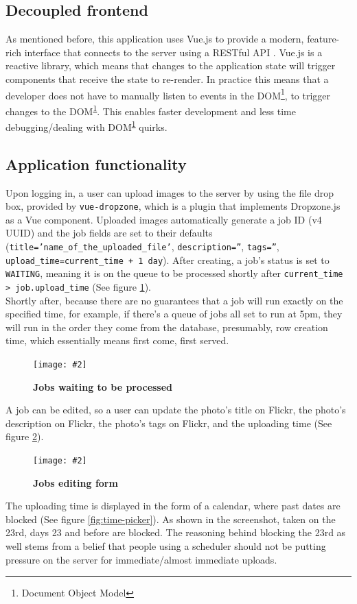 \documentclass[10pt, a4paper]{article}
\newcommand{\figuremacro}[5]{
\begin{figure}[#1]
\centering
\texttt{[image: \#2]}
\caption[#3]{\textbf{#3}#4}
\label{fig:#2}
\end{figure}
}
\newcommand{\footref}[1]{\textsuperscript{\ref{#1}}}
\begin{document}
        \subsection{Decoupled frontend}
        As mentioned before, this application uses Vue.js to provide a modern, feature-rich interface that connects to the server using a RESTful API \cite{restful_api}. Vue.js is a reactive library, which means that changes to the application state will trigger components that receive the state to re-render. In practice this means that a developer does not have to manually listen to events in the DOM\footnote{\label{ft:DOM}Document Object Model}, to trigger changes to the DOM\footref{ft:DOM}. This enables faster development and less time debugging/dealing with DOM\footref{ft:DOM} quirks.

        \subsection{Application functionality}
        Upon logging in, a user can upload images to the server by using the file drop box, provided by \texttt{vue-dropzone}\cite{vue-dropzone}, which is a plugin that implements Dropzone.js as a Vue component. Uploaded images automatically generate a job ID (v4 UUID\cite{itu_uuid}) and the job fields are set to their defaults (\texttt{title='name\_of\_the\_uploaded\_file'}, \texttt{description=''}, \texttt{tags=''}, \texttt{upload\_time=current\_time + 1 day}). After creating, a job's status is set to \texttt{WAITING}, meaning it is on the queue to be processed shortly after \texttt{current\_time > job.upload\_time} (See figure \ref{fig:waiting-jobs}).\\
        Shortly after, because there are no guarantees that a job will run exactly on the specified time, for example, if there's a queue of jobs all set to run at 5pm, they will run in the order they come from the database, presumably, row creation time, which essentially means first come, first served.

        \figuremacro{h}{waiting-jobs}{Jobs waiting to be processed}{}{1.0}

        A job can be edited, so a user can update the photo's title on Flickr, the photo's description on Flickr, the photo's tags on Flickr, and the uploading time (See figure \ref{fig:editing-job}).

        \figuremacro{h}{editing-job}{Jobs editing form}{}{1.0}

        The uploading time is displayed in the form of a calendar, where past dates are blocked (See figure \ref{fig:time-picker}). As shown in the screenshot, taken on the 23rd, days 23 and before are blocked.
        The reasoning behind blocking the 23rd as well stems from a belief that people using a scheduler should not be putting pressure on the server for immediate/almost immediate uploads.
\end{document}
